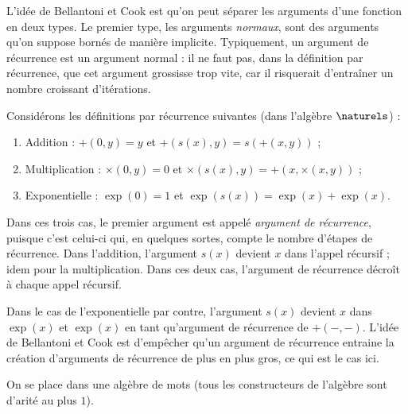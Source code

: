 \documentclass{report}
\begin{document}
			L'idée de Bellantoni et Cook \cite{BellantoniCook1992} est qu'on peut séparer les arguments d'une fonction en deux types. Le premier type, les arguments \emph{normaux}, sont des arguments qu'on suppose bornés de manière implicite. Typiquement, un argument de récurrence est un argument normal : il ne faut pas, dans la définition par récurrence, que cet argument grossisse trop vite, car il risquerait d'entraîner un nombre croissant d'itérations. 
			
			\begin{example}
				
				Considérons les définitions par récurrence suivantes (dans l'algèbre $\naturels$) :
				
				\begin{enumerate}
					\item	\label{itm:addition}
							Addition : $+(0 , y) = y$ et $+(s(x), y) = s\left( +(x, y)\right)$ ; 
							
					\item	\label{itm:multiplication}
							Multiplication : $\times \left( 0, y \right) = 0$ et $\times \left( s(x), y \right) = +\left( x, \times\left( x, y \right) \right)$ ; 
							
					\item	\label{itm:exponentielle}
							Exponentielle : $\exp(0) = 1$ et $\exp(s(x)) = \exp(x) + \exp(x)$.
				\end{enumerate}
				
				Dans ces trois cas, le premier argument est appelé \emph{argument de récurrence}, puisque c'est celui-ci qui, en quelques sortes, compte le nombre d'étapes de récurrence. Dans l'addition, l'argument $s(x)$ devient $x$ dans l'appel récursif ; idem pour la multiplication. Dans ces deux cas, l'argument de récurrence décroît à chaque appel récursif. 
				
				Dans le cas de l'exponentielle par contre, l'argument $s(x)$ devient $x$ dans $\exp(x)$ et $\exp(x)$ en tant qu'argument de récurrence de $+(-,-)$. L'idée de Bellantoni et Cook est d'empêcher qu'un argument de récurrence entraine la création d'arguments de récurrence de plus en plus gros, ce qui est le cas ici.
				
			\end{example}
			
			
			
			
			On se place dans une algèbre de mots (tous les constructeurs de l'algèbre sont d'arité au plus $1$).
			
\end{document}
